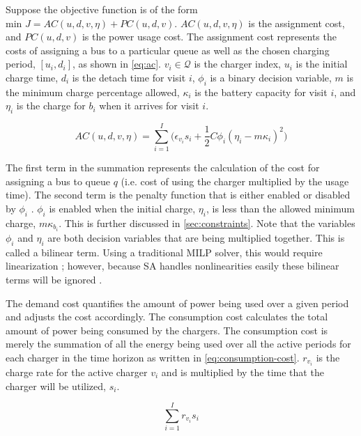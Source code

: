 \documentclass[11pt,a4paper,final]{article}
\newcommand{\AC}{AC(u, d, v, \eta)}            %
\newcommand{\PC}{PC(u, d, v)}               %
\newcommand{\Qset}{\mathcal{Q}}             %
\begin{document}
Suppose the objective function is of the form \(\text{min } J = \AC + \PC\). \(\AC\) is the assignment cost, and \(\PC\) is
the power usage cost. The assignment cost represents the costs of assigning a bus to a particular queue as well as the
chosen charging period, \([u_i, d_i]\), as shown in \ref{eq:ac}. \(v_i \in \Qset\) is the charger index, \(u_i\) is the initial
charge time, \(d_i\) is the detach time for visit \(i\), \(\phi_i\) is a binary decision variable, \(m\) is the minimum charge
percentage allowed, \(\kappa_i\) is the battery capacity for visit \(i\), and \(\eta_i\) is the charge for \(b_i\) when it
arrives for visit \(i\).

\begin{equation}
\label{eq:ac}
\AC = \sum_{i=1}^I \Big(\epsilon_{v_i}s_i + \frac{1}{2} C \phi_i (\eta_i - m \kappa_i)^{2}\Big)
\end{equation}

The first term in the summation represents the calculation of the cost for assigning a bus to queue \(q\) (i.e. cost of
using the charger multiplied by the usage time). The second term is the penalty function that is either enabled or
disabled by \(\phi_i\) \cite{luenberger-2008-penal-barrier-method}. \(\phi_i\) is enabled when the initial charge, \(\eta_i\), is less
than the allowed minimum charge, \(m\kappa_{b_i}\). This is further discussed in \ref{sec:constraints}. Note that the variables
\(\phi_i\) and \(\eta_i\) are both decision variables that are being multiplied together. This is called a bilinear term. Using a
traditional MILP solver, this would require linearization \cite{rodriguez-2013-compar-asses}; however, because SA handles
nonlinearities easily these bilinear terms will be ignored \cite{radosavljevic-2018-metah-optim}.

The demand cost quantifies the amount of power being used over a given period and adjusts the cost accordingly. The
consumption cost calculates the total amount of power being consumed by the chargers. The consumption cost is merely the
summation of all the energy being used over all the active periods for each charger in the time horizon as written in
\ref{eq:consumption-cost}. \(r_{v_i}\) is the charge rate for the active charger \(v_i\) and is multiplied by the time that the
charger will be utilized, \(s_i\).

\begin{equation}
\label{eq:consumption-cost}
  \sum_{i=1}^I r_{v_i}s_i
\end{equation}
\end{document}
